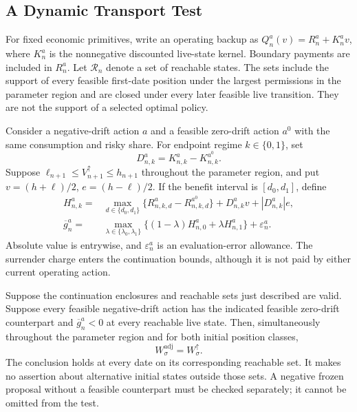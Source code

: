 \subsection{A Dynamic Transport Test}
For fixed economic primitives, write an operating backup as
$Q_n^a(v)=R_n^a+K_n^a v$, where $K_n^a$ is the nonnegative discounted live-state kernel. Boundary payments are included in $R_n^a$. Let $\mathcal R_n$ denote a set of reachable states. The sets include the support of every feasible first-date position under the largest permissions in the parameter region and are closed under every later feasible live transition. They are not the support of a selected optimal policy.

Consider a negative-drift action $a$ and a feasible zero-drift action $a^0$ with the same consumption and risky share. For endpoint regime $k\in\{0,1\}$, set
\begin{equation}
 D_{n,k}^a=K_{n,k}^a-K_{n,k}^{a^0}.
\end{equation}
Suppose $\ell_{n+1}\leq V^\uparrow_{n+1}\leq h_{n+1}$ throughout the parameter region, and put $v=(h+\ell)/2$, $e=(h-\ell)/2$. If the benefit interval is $[d_0,d_1]$, define
\begin{align}
 H_{n,k}^a={}&\max_{d\in\{d_0,d_1\}}
       \{R_{n,k,d}^a-R_{n,k,d}^{a^0}\}
       +D_{n,k}^a v+|D_{n,k}^a|e,\\
 \overline g_n^a={}&\max_{\lambda\in\{\lambda_0,\lambda_1\}}
       \{(1-\lambda)H_{n,0}^a+\lambda H_{n,1}^a\}
       +\varepsilon_n^a .
 \label{eq:r11_transport_test}
\end{align}
Absolute value is entrywise, and $\varepsilon_n^a$ is an evaluation-error allowance. The surrender charge enters the continuation bounds, although it is not paid by either current operating action.

\begin{proposition}
\label{prop:r11_transport}
Suppose the continuation enclosures and reachable sets just described are valid. Suppose every feasible negative-drift action has the indicated feasible zero-drift counterpart and $\overline g_n^a<0$ at every reachable live state. Then, simultaneously throughout the parameter region and for both initial position classes,
\begin{equation}
 W^{\mathrm{adj}}_\sigma=W^\uparrow_\sigma.
 \label{eq:r11_upward_equality}
\end{equation}
The conclusion holds at every date on its corresponding reachable set. It makes no assertion about alternative initial states outside those sets. A negative frozen proposal without a feasible counterpart must be checked separately; it cannot be omitted from the test.
\end{proposition}

